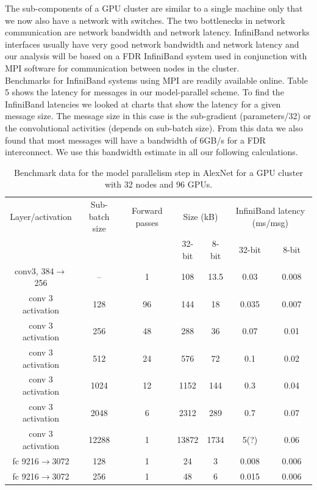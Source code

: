 \documentclass{article} %
\begin{document}
The sub-components of a GPU cluster are similar to a single machine only that we now also have a network with switches. The two bottlenecks in network communication are network bandwidth and network latency. InfiniBand networks interfaces usually have very good network bandwidth and network latency and our analysis will be based on a FDR InfiniBand system used in conjunction with MPI software for communication between nodes in the cluster.\\
Benchmarks for InfiniBand systems using MPI are readily available online. Table 5 shows the latency for messages in our model-parallel scheme. To find the InfiniBand latencies we looked at charts that show the latency for a given message size. The message size in this case is the sub-gradient (parameters/32) or the convolutional activities (depends on sub-batch size). From this data we also found that most messages will have a bandwidth of 6GB/s for a FDR interconnect. We use this bandwidth estimate in all our following calculations.

\begin{table}[h]
	\caption{Benchmark data for the model parallelism step in AlexNet for a GPU cluster with 32 nodes and 96 GPUs. }
	\label{sample-table}
	\begin{minipage}
		{\linewidth}
		\centering
		\begin{tabular}{ ccccccc}
			\toprule[1.5pt]
			Layer/activation & Sub-batch size & Forward passes   & \multicolumn{2}{c}{Size (kB)}  &  \multicolumn{2}{c}{InfiniBand latency (ms/msg)}   \\
			& & & 32-bit & 8-bit & 32-bit & 8-bit \\
			\midrule	
			conv3, 384$\rightarrow$256 & --&  1 & 108 & 13.5 & 0.03 & 0.008 \\
			conv 3 activation & 128 & 96  & 144  & 18 &  0.035 & 0.007\\		
			conv 3 activation & 256 & 48   & 288 & 36 &  0.07& 0.01\\	
			conv 3 activation &  512  & 24  &  576 & 72 & 0.1 & 0.02\\		
			conv 3 activation &  1024 & 12   & 1152& 144 & 0.3 & 0.04\\	
			conv 3 activation &  2048 & 6   & 2312& 289 & 0.7 & 0.07\\	
			conv 3 activation &  12288 & 1   & 13872 & 1734 & 5(?) & 0.06\\	
			fc 9216$\rightarrow$3072 & 128  &  1 & 24 & 3 & 0.008 & 0.006\\
			fc 9216$\rightarrow$3072 & 256   & 1 & 48 & 6 & 0.015 & 0.006\\
			
			\bottomrule[1.25pt]
		\end{tabular}
		\par
		\bigskip
	\end{minipage}
\end{table}
\end{document}
